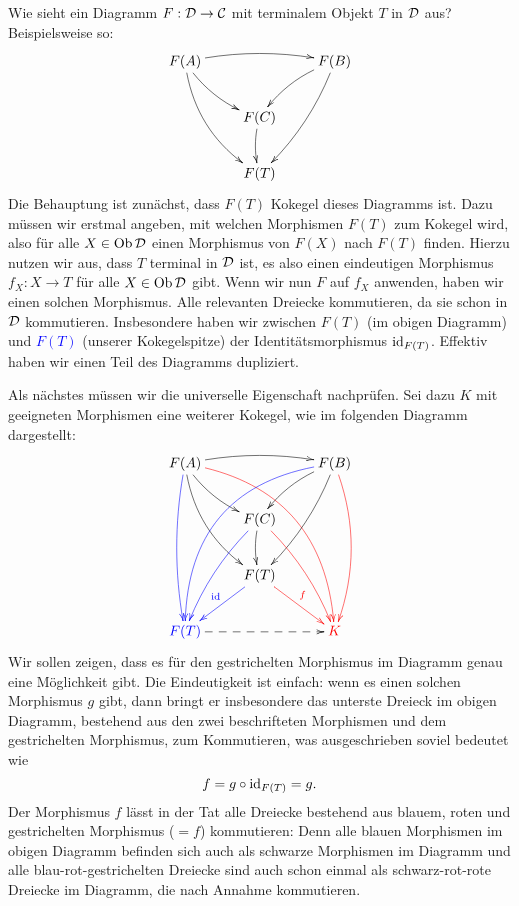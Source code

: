 \documentclass{pizzablatt}
\begin{document}

\begin{aufgabe}{}
Wie sieht ein Diagramm $F:\mathcal{D} \to \mathcal{C}$ mit terminalem Objekt $T$ in $\mathcal{D}$ aus? Beispielsweise so:
\[ \xymatrix{
  F(A) \ar@/^/[rr] \ar@/_/[dr] \ar@/_1pc/[ddr] && F(B) \ar@/_/[dl] \ar@/^/[ddl] \\
  & F(C) \ar@/_0.25pc/[d] \\
  & F(T)
} \]
Die Behauptung ist zunächst, dass $F(T)$ Kokegel dieses Diagramms ist. Dazu müssen wir erstmal angeben, mit welchen Morphismen $F(T)$ zum Kokegel wird, also für alle $X \in \operatorname{Ob} \mathcal{D}$ einen Morphismus von $F(X)$ nach $F(T)$ finden. Hierzu nutzen wir aus, dass $T$ terminal in $\mathcal{D}$ ist, es also einen eindeutigen Morphismus $f_X:X \to T$ für alle $X \in \operatorname{Ob} \mathcal{D}$ gibt. Wenn wir nun $F$ auf $f_X$ anwenden, haben wir einen solchen Morphismus. Alle relevanten Dreiecke kommutieren, da sie schon in $\mathcal{D}$ kommutieren. Insbesondere haben wir zwischen $F(T)$ (im obigen Diagramm) und \textcolor{blue}{$F(T)$} (unserer Kokegelspitze) der Identitätsmorphismus \textcolor{blue}{$\mathrm{id}_{F(T)}$}. Effektiv haben wir einen Teil des Diagramms dupliziert.

Als nächstes müssen wir die universelle Eigenschaft nachprüfen. Sei dazu $K$ mit geeigneten Morphismen eine weiterer Kokegel, wie im folgenden Diagramm dargestellt:
\[ \xymatrix{
  F(A) \ar@/^/[rr] \ar@/_/[dr] \ar@/_1pc/[ddr] \ar@/_0.5pc/@[blue][ddd] \ar@/^2.7pc/@[red][dddrr] && F(B) \ar@/_/[dl] \ar@/^/[ddl] \ar@/_3pc/@[blue][llddd] \ar@/^1pc/@[red][ddd] \\
  & F(C) \ar@/_0.25pc/[d] \ar@/_0.5pc/@[blue][ldd] \ar@/^0.5pc/@[red][rdd] \\
  & F(T) \ar@[blue][ld]_{\color{blue}{\id}} \ar@[red][rd]^{\color{red}{f}} \\
  \color{blue}{F(T)} \ar@{-->}[rr] && \color{red}{K}
} \]
Wir sollen zeigen, dass es für den gestrichelten Morphismus im Diagramm genau eine Möglichkeit gibt. Die Eindeutigkeit ist einfach: wenn es einen solchen Morphismus $g$ gibt, dann bringt er insbesondere das unterste Dreieck im obigen Diagramm, bestehend aus den zwei beschrifteten Morphismen und dem gestrichelten Morphismus, zum Kommutieren, was ausgeschrieben soviel bedeutet wie
\[ f = g \circ \mathrm{id}_{F(T)} = g. \]
Der Morphismus $f$ lässt in der Tat alle Dreiecke bestehend aus blauem, roten und gestrichelten Morphismus ($= f$) kommutieren: Denn alle blauen Morphismen im obigen Diagramm befinden sich auch als schwarze Morphismen im Diagramm und alle blau-rot-gestrichelten Dreiecke sind auch schon einmal als schwarz-rot-rote Dreiecke im Diagramm, die nach Annahme kommutieren.
\end{aufgabe}
\end{document}
